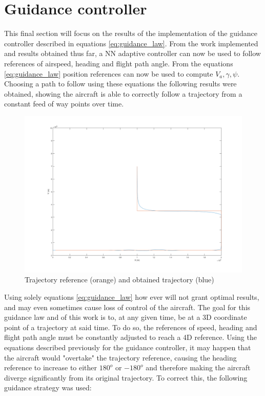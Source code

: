 \section{Guidance controller}
\label{section:results/guidance_control}

This final section will focus on the results of the implementation of the guidance controller described in equations \ref{eq:guidance_law}. From the work implemented and results obtained thus far, a NN adaptive controller can now be used to follow references of airspeed, heading and flight path angle. From the equations \ref{eq:guidance_law} position references can now be used to compute $V_a,\gamma, \psi$. Choosing a path to follow using these equations the following results were obtained, showing the aircraft is able to correctly follow a trajectory from a constant feed of way points over time.

\begin{figure}[H]
\centering
\includegraphics[width=1\textwidth]{Figures/Results/guidance.png}
\caption[Trajectory following with guidance controller]{Trajectory reference (orange) and obtained trajectory (blue)}
\label{fig:guidance}
\end{figure}

Using solely equations \ref{eq:guidance_law} how ever will not grant optimal results, and may even sometimes cause loss of control of the aircraft. The goal for this guidance law and of this work is to, at any given time, be at a 3D coordinate point of a trajectory at said time. To do so, the references of speed, heading and flight path angle must be constantly adjusted to reach a 4D reference. Using the equations described previously for the guidance controller, it may happen that the aircraft would "overtake" the trajectory reference, causing the heading reference to increase to either $180^o$ or $-180^o$ and therefore making the aircraft diverge significantly from its original trajectory. To correct this, the following guidance strategy was used:

